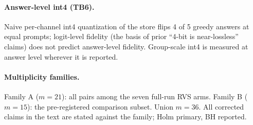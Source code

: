 \paragraph{Answer-level int4 (TB6).} Naive per-channel int4 quantization of the store flips 4 of 5 greedy answers at equal prompts; logit-level fidelity (the basis of prior ``4-bit is near-lossless'' claims) does not predict answer-level fidelity. Group-scale int4 is measured at answer level wherever it is reported.

\paragraph{Multiplicity families.} Family A ($m{=}21$): all pairs among the seven full-run RVS arms. Family B ($m{=}15$): the pre-registered comparison subset. Union $m{=}36$. All corrected claims in the text are stated against the family; Holm primary, BH reported.

